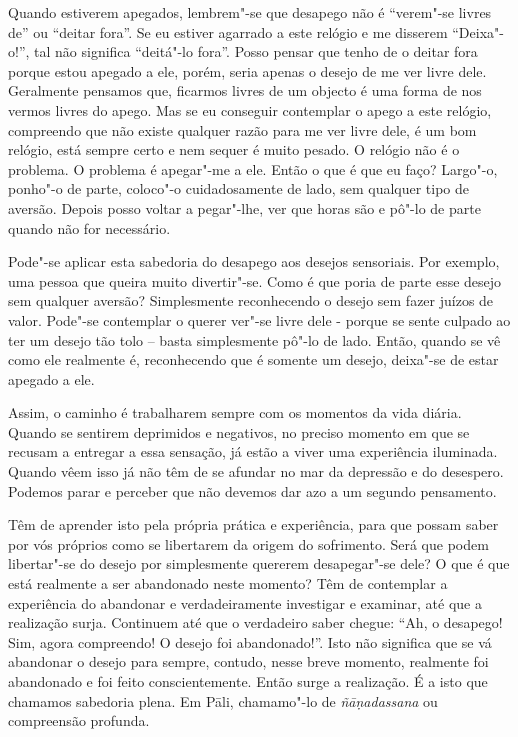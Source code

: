 Quando estiverem apegados, lembrem"-se que desapego não é “verem"-se livres de” ou
“deitar fora”. Se eu estiver agarrado a este relógio e me disserem “Deixa"-o!”,
tal não significa “deitá"-lo fora”. Posso pensar que tenho de o deitar fora
porque estou apegado a ele, porém, seria apenas o desejo de me ver livre dele.
Geralmente pensamos que, ficarmos livres de um objecto é uma forma de nos vermos
livres do apego. Mas se eu conseguir contemplar o apego a este relógio,
compreendo que não existe qualquer razão para me ver livre dele, é um bom
relógio, está sempre certo e nem sequer é muito pesado. O relógio não é o
problema. O problema é apegar"-me a ele. Então o que é que eu faço? Largo"-o,
ponho"-o de parte, coloco"-o cuidadosamente de lado, sem qualquer tipo de aversão.
Depois posso voltar a pegar"-lhe, ver que horas são e pô"-lo de parte quando não
for necessário.

Pode"-se aplicar esta sabedoria do desapego aos desejos sensoriais. Por exemplo,
uma pessoa que queira muito divertir"-se. Como é que poria de parte esse desejo
sem qualquer aversão? Simplesmente reconhecendo o desejo sem fazer juízos de
valor. Pode"-se contemplar o querer ver"-se livre dele - porque se sente culpado
ao ter um desejo tão tolo -- basta simplesmente pô"-lo de lado. Então, quando se
vê como ele realmente é, reconhecendo que é somente um desejo, deixa"-se de estar
apegado a ele.

Assim, o caminho é trabalharem sempre com os momentos da vida diária. Quando se
sentirem deprimidos e negativos, no preciso momento em que se recusam a entregar
a essa sensação, já estão a viver uma experiência iluminada. Quando vêem isso já
não têm de se afundar no mar da depressão e do desespero. Podemos parar e
perceber que não devemos dar azo a um segundo pensamento.

Têm de aprender isto pela própria prática e experiência, para que possam saber
por vós próprios como se libertarem da origem do sofrimento. Será que podem
libertar"-se do desejo por simplesmente quererem desapegar"-se dele? O que é que
está realmente a ser abandonado neste momento? Têm de contemplar a experiência
do abandonar e verdadeiramente investigar e examinar, até que a realização
surja. Continuem até que o verdadeiro saber chegue: “Ah, o desapego! Sim, agora
compreendo! O desejo foi abandonado!”. Isto não significa que se vá abandonar o
desejo para sempre, contudo, nesse breve momento, realmente foi abandonado e foi
feito conscientemente. Então surge a realização. É a isto que
chamamos sabedoria plena. Em Pāli, chamamo"-lo de \emph{ñāṇadassana} ou
compreensão profunda.

